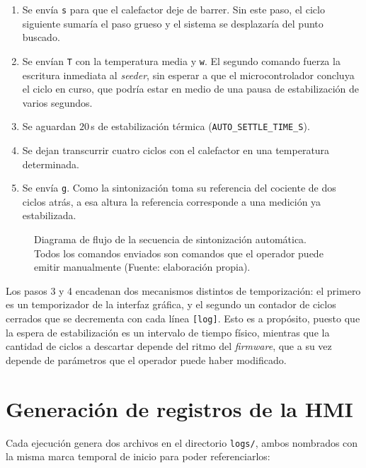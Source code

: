 \begin{enumerate}
\item Se envía \texttt{s} para que el calefactor deje de barrer. Sin este paso, el ciclo siguiente sumaría el paso grueso y el sistema se desplazaría del punto buscado.
\item Se envían \texttt{T} con la temperatura media y \texttt{w}. El segundo comando fuerza la escritura inmediata al \emph{seeder}, sin esperar a que el microcontrolador concluya el ciclo en curso, que podría estar en medio de una pausa de estabilización de varios segundos.
\item Se aguardan $20$\,s de estabilización térmica (\texttt{AUTO\_SETTLE\_TIME\_S}).
\item Se dejan transcurrir cuatro ciclos con el calefactor en una temperatura determinada.
\item Se envía \texttt{g}. Como la sintonización toma su referencia del cociente de dos ciclos atrás, a esa altura la referencia corresponde a una medición ya estabilizada.
\end{enumerate}

\begin{figure}[htbp]
\centering
\resizebox{\textwidth}{!}{}
\caption[Diagrama de flujo de la sintonización automática]%
{Diagrama de flujo de la secuencia de sintonización automática. Todos los comandos enviados son comandos que el operador puede emitir manualmente (Fuente: elaboración propia).}
\label{fig:hmi-auto}
\end{figure}

Los pasos 3 y 4 encadenan dos mecanismos distintos de temporización: el primero es un temporizador de la interfaz gráfica, y el segundo un contador de ciclos cerrados que se decrementa con cada línea \texttt{[log]}. Esto es a propósito, puesto que la espera de estabilización es un intervalo de tiempo físico, mientras que la cantidad de ciclos a descartar depende del ritmo del \emph{firmware}, que a su vez depende de parámetros que el operador puede haber modificado.

\section{Generación de registros de la HMI}
\label{sec:hmi-registro}

Cada ejecución genera dos archivos en el directorio \texttt{logs/}, ambos nombrados con la misma marca temporal de inicio para poder referenciarlos:


